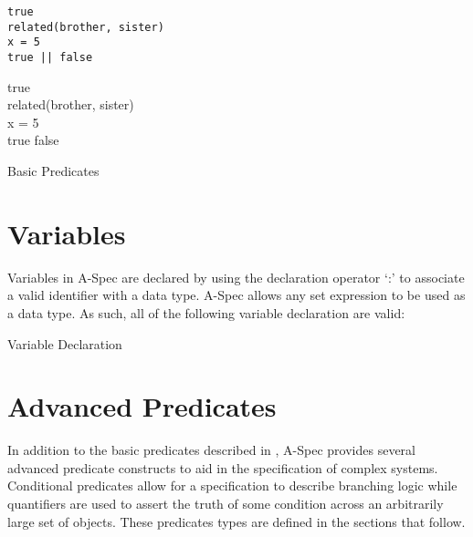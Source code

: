 \documentclass[letterpaper,10pt,draft]{book}
\begin{document}
\begin{example}
\begin{minipage}[t]{0.49\linewidth}
\begin{verbatim}
true
related(brother, sister)
x = 5
true || false
\end{verbatim}
\end{minipage}
\begin{minipage}[t]{0.49\linewidth}
\azed
\begin{zed}
   true \\
   related(brother, sister) \\
   x = 5 \\
   true \lor false \\
\end{zed}
\end{minipage}

   \caption{Basic Predicates}
   \label{ex:Predicates}
\end{example}

\section{Variables}
   \label{sect:Variables}

Variables in A-Spec are declared by using the declaration operator `:' to associate
a valid identifier with a data type.  A-Spec allows any set expression to be used
as a data type.  As such, all of the following variable declaration are valid:

\begin{example}
\begin{minipage}[t]{0.49\linewidth}
   
\end{minipage}
\begin{minipage}[t]{0.49\linewidth}
   \azbox
   
\end{minipage}

   \caption{Variable Declaration}
   \label{ex:VarDecl}
\end{example}

\section{Advanced Predicates}
   \label{sect:AdvPred}

In addition to the basic predicates described in , A-Spec
provides several advanced predicate constructs to aid in the specification of complex
systems.  Conditional predicates allow for a specification to describe branching
logic while quantifiers are used to assert the truth of some condition across an
arbitrarily large set of objects.  These predicates types are defined in the sections
that follow.
\end{document}
